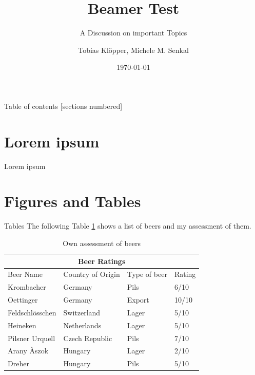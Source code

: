 \documentclass[10pt]{beamer}
\title{Beamer Test}
\subtitle{A Discussion on important Topics}
\date{\today}
\author{Tobias Klöpper, Michele M. Senkal}
\institute{Institute for Brewing and Degustation}
\begin{document}
\maketitle

\begin{frame}{Table of contents}
  [sections numbered]
  \tableofcontents%
\end{frame}

\section{Lorem ipsum}
\begin{frame}{Lorem ipsum}
\blindtext
\end{frame}

\section{Figures and Tables}
\begin{frame}{Tables}
The following Table \ref{table:1} shows a list of beers and my assessment of them.
\begin{table}[h!]
\begin{tabular}{ |p{3cm}||p{3cm}|p{2cm}|p{1cm}|  }
 \hline
 \multicolumn{4}{|c|}{Beer Ratings} \\
 \hline
 Beer Name & Country of Origin &Type of beer&Rating\\
 \hline
 Krombacher   & Germany    & Pils &   6/10\\
 Oettinger&   Germany  & Export   &10/10\\
 Feldschlösschen &Switzerland & Lager &  5/10\\
 Heineken    &Netherlands & Lager &  5/10\\
 Pilsner Urquell&   Czech Republic  & Pils & 7/10\\
 Arany Àszok& Hungary  & Lager   & 2/10\\
 Dreher& Hungary  & Pils & 5/10\\
 \hline
 \end{tabular}
 \caption{Own assessment of beers}
 \label{table:1}
\end{table}
\end{frame}
\end{document}
